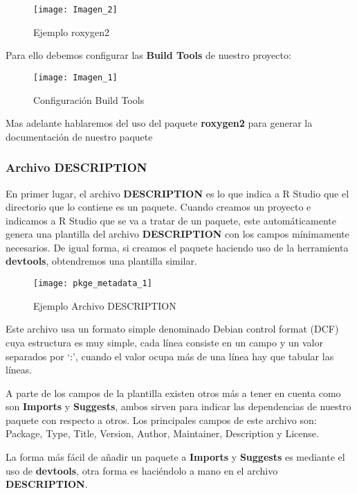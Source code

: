 \begin{figure}[H]
    \centering
    \texttt{[image: Imagen\_2]}
    \caption{Ejemplo roxygen2   }
    \label{fig:roxygen}
\end{figure} 

Para ello debemos configurar las \textbf{Build Tools} de nuestro proyecto:

\begin{figure}[H]
    \centering
    \texttt{[image: Imagen\_1]}
    \caption{Configuraci\'on Build Tools }
    \label{fig:build_tools}
\end{figure} 

Mas adelante hablaremos del uso del paquete \textbf{roxygen2} para generar la documentación de nuestro paquete

\subsubsection{Archivo DESCRIPTION}

En primer lugar, el archivo \textbf{DESCRIPTION} es lo que indica a R Studio que el directorio que lo
contiene es un paquete. Cuando creamos un proyecto e indicamos a R Studio que se va a
tratar de un paquete, este autom\'aticamente genera una plantilla del archivo \textbf{DESCRIPTION}
con los campos m\'inimamente necesarios. De igual forma, si creamos el paquete haciendo uso de la herramienta \textbf{devtools}, obtendremos
una plantilla similar.

\begin{figure}[H]
    \centering
    \texttt{[image: pkge\_metadata\_1]}
    \caption{Ejemplo Archivo DESCRIPTION }
    \label{fig:description}
\end{figure}

Este archivo usa un formato simple denominado Debian control format (DCF) cuya estructura
es muy simple, cada l\'inea consiste en un campo y un valor separados por \enquote*{:}, cuando el valor
ocupa m\'as de una l\'inea hay que tabular las l\'ineas.

A parte de los campos de la plantilla existen otros m\'as a tener en cuenta como son \textbf{Imports}
y \textbf{Suggests}, ambos sirven para indicar las dependencias de nuestro paquete con respecto a otros.
Los principales campos de este archivo son: Package, Type, Title, Version, Author, Maintainer, Description y License.

La forma m\'as f\'acil de a\~nadir un paquete a \textbf{Imports} y \textbf{Suggests} es mediante el uso de
\textbf{devtools}, otra forma es haci\'endolo a mano en el archivo \textbf{DESCRIPTION}.

